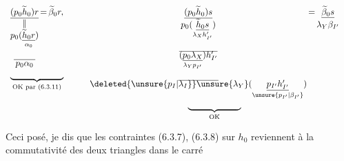\[
\begin{aligned}
&\begin{array}[t]{c@{\,}c@{\,}c}
 \underline{(p_0\widetilde h_0)r}&=&\widetilde\beta_0 r,\\
 \Vert&&\\
 p_0(\underset{\alpha_0}{\underline{\widetilde h_0r}})&&\\
 \underline{\phantom{p_0\widetilde h_0r}}&&\\[-2pt]
 p_0\alpha_0&&\\
 \multicolumn{3}{c}{\underbrace{\hphantom{(p_0\widetilde h_0)r=\widetilde\beta_0r}}_{\text{OK par (6.3.11)}}}
\end{array}
\qquad
\begin{array}[t]{c@{\,}c@{\,}c}
 \underline{(p_0\widetilde h_0)s}&=&\underline{\widetilde\beta_0s}\\
 p_0(\underset{\lambda_Xh'_{I'}}{\underline{\widetilde h_0s}})&&\lambda_Y\beta_{I'}\\
 \underline{\phantom{(p_0\lambda_X)h'_{I'}}}&&\\[-2pt]
 (\underset{\lambda_Yp_{I'}}{\underline{p_0\lambda_X}})h'_{I'}&&\\
 \underline{\phantom{\lambda_Y(p_{I'}h'_{I'})}}&&\\[-2pt]
 \deleted{\unsure{p_I|\lambda_I}}\unsure{\lambda_Y}(\underset{\unsure{p_{I'}|\beta_{I'}}}{\underline{p_{I'}h'_{I'}}})&&\\
 \multicolumn{3}{c}{\underbrace{\hphantom{(p_0\widetilde h_0)s=\widetilde\beta_0s}}_{\text{OK}}}
\end{array}
\end{aligned}
\]

Ceci posé, je dis que les contraintes
(6.3.7), (6.3.8) sur $h_0$ reviennent à la
commutativité des deux triangles dans
le carré



